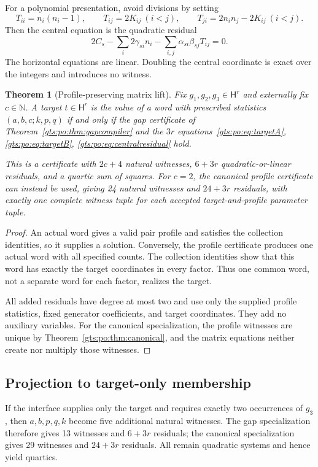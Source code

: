 \documentclass[11pt,letterpaper]{article}
\newtheorem{theorem}{Theorem}[section]
\theoremstyle{definition}
\theoremstyle{remark}
\newcommand{\N}{\mathbb N}
\newcommand{\HH}{\mathsf H}
\begin{document}
For a polynomial presentation, avoid divisions by setting
\[
 T_{ii}=n_i(n_i-1),\qquad T_{ij}=2K_{ij}\ (i<j),
 \qquad T_{ji}=2n_i n_j-2K_{ij}\ (i<j).
\]
Then the central equation is the quadratic residual
\begin{equation}\label{gts:po:eq:centralresidual}
 2C_s-\sum_i2\gamma_{si}n_i-
                  \sum_{i,j}\alpha_{si}\beta_{sj}T_{ij}=0.
\end{equation}
The horizontal equations are linear. Doubling the central coordinate is exact over the integers and introduces no witness.

\begin{theorem}[Profile-preserving matrix lift]\label{gts:po:thm:lift}
Fix $g_1,g_2,g_3\in\HH^r$ and externally fix $c\in\N$. A target $t\in\HH^r$ is the value of a word with prescribed statistics $(a,b,c;k,p,q)$ if and only if the gap certificate of Theorem~\ref{gts:po:thm:gapcompiler} and the $3r$ equations~\eqref{gts:po:eq:targetA}, \eqref{gts:po:eq:targetB}, \eqref{gts:po:eq:centralresidual} hold.

This is a certificate with $2c+4$ natural witnesses, $6+3r$ quadratic-or-linear residuals, and a quartic sum of squares. For $c=2$, the canonical profile certificate can instead be used, giving 24 natural witnesses and $24+3r$ residuals, with exactly one complete witness tuple for each accepted target-and-profile parameter tuple.
\end{theorem}
\begin{proof}
An actual word gives a valid pair profile and satisfies the collection identities, so it supplies a solution. Conversely, the profile certificate produces one actual word with all specified counts. The collection identities show that this word has exactly the target coordinates in every factor. Thus one common word, not a separate word for each factor, realizes the target.

All added residuals have degree at most two and use only the supplied profile statistics, fixed generator coefficients, and target coordinates. They add no auxiliary variables. For the canonical specialization, the profile witnesses are unique by Theorem~\ref{gts:po:thm:canonical}, and the matrix equations neither create nor multiply those witnesses.
\end{proof}

\subsection{Projection to target-only membership}\label{gts:po:sec:projection}
If the interface supplies only the target and requires exactly two occurrences of $g_3$, then $a,b,p,q,k$ become five additional natural witnesses. The gap specialization therefore gives 13 witnesses and $6+3r$ residuals; the canonical specialization gives 29 witnesses and $24+3r$ residuals. All remain quadratic systems and hence yield quartics.
\end{document}
